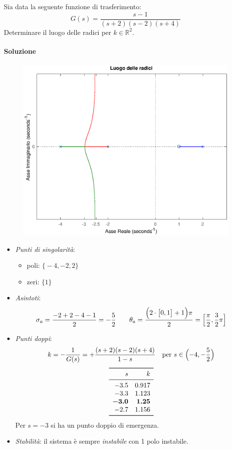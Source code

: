 \begin{esercizio}
Sia data la seguente funzione di trasferimento:
\[
	G(s) = \frac{s-1}{(s+2)(s-2)(s+4)}
\]
Determinare il luogo delle radici per \(k\in\mathbb{R}^2\).

\paragraph{Soluzione}

\begin{figure}[ht]
	\centering
	\includegraphics[scale=.6]{mod1/assets/rl_ex39}
\end{figure}

\begin{itemize}
	\item \emph{Punti di singolarità}:
		\begin{itemize}
			\item poli: \(\bigl\{ -4,-2,2 \bigr\}\) \\
			\item zeri: \(\bigl\{ 1 \bigr\}\)
		\end{itemize}
	\item \emph{Asintoti}:
		\[
			\sigma_a = \frac{-2+2-4-1}{2} = -\frac{5}{2} \qquad
			\theta_a = \frac{\Bigl(2\cdot \bigl[0,1\bigr] +1\Bigr)\pi}{2} = \Bigl[ \frac{\pi}{2},\frac{3}{2}\pi \Bigr]
		\]
	\item \emph{Punti doppi}:
		\[
			k = -\frac{1}{G(s)} = + \frac{(s+2)(s-2)(s+4)}{1-s} \quad
			\text{per } s \in \Bigl(-4,-\frac{5}{2}\Bigr)
		\]
		\[\begin{array}{rr}
			\toprule
			s 	  & k 		\\
			\midrule
			-3.5 	  & 0.917 	\\
			-3.3 	  & 1.123 	\\
			\bm{-3.0} & \bm{1.25} 	\\
			-2.7 	  & 1.156	\\
			\bottomrule
		\end{array}\]
		Per \(s=-3\) si ha un punto doppio di emergenza.
	\item \emph{Stabilità}: il sistema è sempre \emph{instabile} con 1 polo instabile.
\end{itemize}
\end{esercizio}

